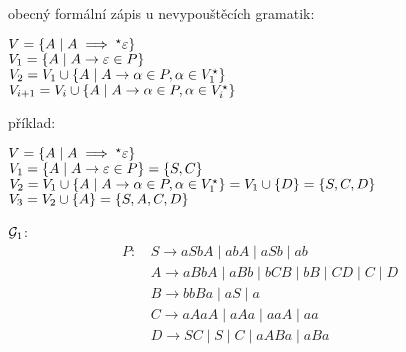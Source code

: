 obecný formální zápis u nevypouštěcích gramatik:

$V = \left\lbrace A \mid A \implies^{\star} \varepsilon \right\rbrace$\\
$V_1 = \left\lbrace A \mid A \rightarrow \varepsilon \in P \right\rbrace$\\
$V_2 = V_1 \cup \left\lbrace A \mid A \rightarrow \alpha \in P, \alpha \in V_1^{\star} \right\rbrace$\\
$V_{i+1} = V_i \cup \left\lbrace A \mid A \rightarrow \alpha \in P, \alpha \in V_i^{\star} \right\rbrace$\\

\begin{multicols}{2}
    příklad:

    $V = \left\lbrace A \mid A \implies^{\star} \varepsilon \right\rbrace$\\
    $V_1 = \left\lbrace A \mid A \rightarrow \varepsilon \in P \right\rbrace = \left\lbrace S, C \right\rbrace$\\
    $V_2 = V_1 \cup \left\lbrace A \mid A \rightarrow \alpha \in P, \alpha \in V_1^{\star} \right\rbrace = V_1 \cup \left\lbrace D \right\rbrace = \left\lbrace S, C, D \right\rbrace$\\
    $V_3 = V_2 \cup \left\lbrace A \right\rbrace = \left\lbrace S, A, C, D \right\rbrace$

\columnbreak

    $\mathcal{G}_1$:
        \begin{align*}
            P\text{: } & S \rightarrow aSbA \mid abA \mid aSb \mid ab  \\
            & A \rightarrow aBbA \mid aBb \mid bCB \mid bB \mid CD \mid C \mid D \\
            & B \rightarrow bbBa \mid aS \mid a\\
            & C \rightarrow aAaA \mid aAa \mid aaA \mid aa \\
            & D \rightarrow SC \mid S \mid C \mid aABa \mid aBa \\
        \end{align*}

\end{multicols}

